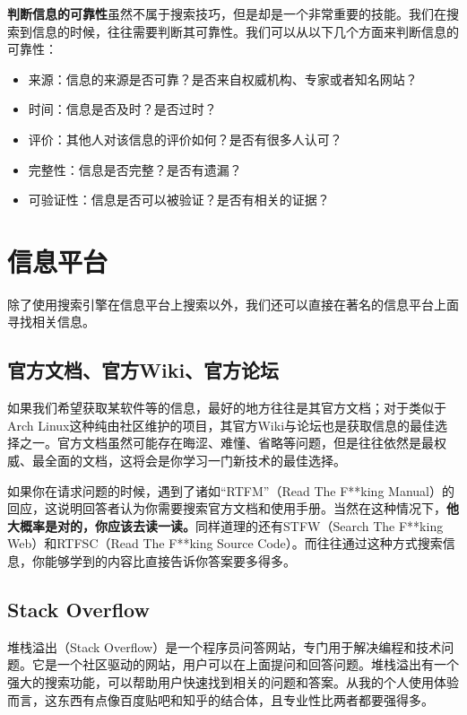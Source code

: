 \documentclass[12pt]{report}
\begin{document}
\textbf{判断信息的可靠性}虽然不属于搜索技巧，但是却是一个非常重要的技能。我们在搜索到信息的时候，往往需要判断其可靠性。我们可以从以下几个方面来判断信息的可靠性：
\begin{itemize}
    \item 来源：信息的来源是否可靠？是否来自权威机构、专家或者知名网站？
    \item 时间：信息是否及时？是否过时？
    \item 评价：其他人对该信息的评价如何？是否有很多人认可？
    \item 完整性：信息是否完整？是否有遗漏？
    \item 可验证性：信息是否可以被验证？是否有相关的证据？
\end{itemize}

\section{信息平台}

除了使用搜索引擎在信息平台上搜索以外，我们还可以直接在著名的信息平台上面寻找相关信息。

\subsection{官方文档、官方Wiki、官方论坛}

如果我们希望获取某软件等的信息，最好的地方往往是其官方文档；对于类似于Arch Linux这种纯由社区维护的项目，其官方Wiki与论坛也是获取信息的最佳选择之一。官方文档虽然可能存在晦涩、难懂、省略等问题，但是往往依然是最权威、最全面的文档，这将会是你学习一门新技术的最佳选择。

如果你在请求问题的时候，遇到了诸如“RTFM”（Read The F**king Manual）的回应，这说明回答者认为你需要搜索官方文档和使用手册。当然在这种情况下，\textbf{他大概率是对的，你应该去读一读。}同样道理的还有STFW（Search The F**king Web）和RTFSC（Read The F**king Source Code）。而往往通过这种方式搜索信息，你能够学到的内容比直接告诉你答案要多得多。

\subsection{Stack Overflow}

堆栈溢出（Stack Overflow）是一个程序员问答网站，专门用于解决编程和技术问题。它是一个社区驱动的网站，用户可以在上面提问和回答问题。堆栈溢出有一个强大的搜索功能，可以帮助用户快速找到相关的问题和答案。从我的个人使用体验而言，这东西有点像百度贴吧和知乎的结合体，且专业性比两者都要强得多。
\end{document}
